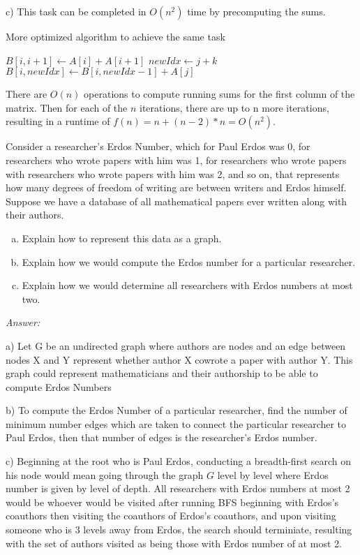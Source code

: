 \documentclass[12pt]{article}
\newenvironment{problem}[2][Problem]{\begin{trivlist}
\item[\hskip \labelsep {\bfseries #1}\hskip \labelsep {\bfseries #2.}]}{\end{trivlist}}
\begin{document}
c) This task can be completed in $O(n^2)$ time by precomputing the sums.
\begin{algorithm}
\caption{More optimized algorithm to achieve the same task}
\begin{algorithmic}
	\State $B[i, i+1] \gets A[i]+A[i+1]$ 
\EndFor
{}
		\State $newIdx \gets j+k$
		\State $B[i, newIdx] \gets B[i, newIdx-1] + A[j]$
	\EndFor
\EndFor
\end{algorithmic}
\end{algorithm}

There are $O(n)$ operations to compute running sums for the first column of the matrix. Then for each of the $n$ iterations, there are up to n more iterations, resulting in a runtime of $f(n) = n+(n-2)*n = O(n^2)$.

\begin{problem}{5}
Consider a researcher's Erdos Number, which for Paul Erdos was 0, for researchers who wrote papers with him was 1, for researchers who wrote papers with researchers who wrote papers with him was 2, and so on, that represents how many degrees of freedom of writing are between writers and Erdos himself. Suppose we have a database of all mathematical papers ever written along with their authors.
\begin{enumerate}[a)]
	\item Explain how to represent this data as a graph.
	\item Explain how we would compute the Erdos number for a particular researcher.
	\item Explain how we would determine all researchers with Erdos numbers at most two.
\end{enumerate} 
\end{problem}
\textit{Answer: }

a) Let G be an undirected graph where authors are nodes and an edge between nodes X and Y represent whether author X cowrote a paper with author Y. This graph could represent mathematicians and their authorship to be able to compute Erdos Numbers

b) To compute the Erdos Number of a particular researcher, find the number of minimum number edges which are taken to connect the particular researcher to Paul Erdos, then that number of edges is the researcher's Erdos number.

c) Beginning at the root who is Paul Erdos, conducting a breadth-first search on his node would mean going through the graph $G$ level by level where Erdos number is given by level of depth. All researchers with Erdos numbers at most 2 would be whoever would be visited after running BFS beginning with Erdos's coauthors then visiting the coauthors of Erdos's coauthors, and upon visiting someone who is 3 levels away from Erdos, the search should terminiate, resulting with the set of authors visited as being those with Erdos number of at most 2.
\end{document}
